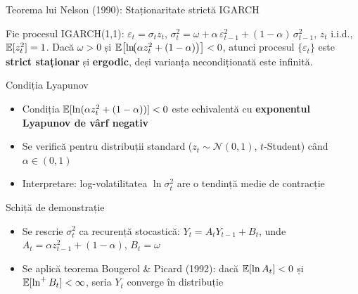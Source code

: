 \documentclass[9pt, aspectratio=169, t]{beamer}
\begin{document}
\begin{frame}{Teorema lui Nelson (1990): Staționaritate strictă IGARCH}
    \small
        \vspace{-2mm}
        \begin{thm}[Nelson, 1990]
            Fie procesul IGARCH(1,1):
            $\varepsilon_t = \sigma_t z_t$, \; $\sigma_t^2 = \omega + \alpha\,\varepsilon_{t-1}^2 + (1 - \alpha)\,\sigma_{t-1}^2$, \; $z_t$ i.i.d., $\mathbb{E}[z_t^2] = 1$.
            Dacă $\omega > 0$ și $\mathbb{E}\bigl[\ln\!\bigl(\alpha z_t^2 + (1 - \alpha)\bigr)\bigr] < 0$, atunci procesul $\{\varepsilon_t\}$ este \textbf{strict staționar} și \textbf{ergodic}, deși varianța necondiționată este infinită.
        \end{thm}
        \vspace{-1mm}
        \begin{block}{Condiția Lyapunov}
            \begin{itemize}
                \item Condiția $\mathbb{E}[\ln(\alpha z_t^2 + (1-\alpha))] < 0$ este echivalentă cu \textbf{exponentul Lyapunov de vârf negativ}
                \item Se verifică pentru distribuții standard ($z_t \sim \mathcal{N}(0,1)$, $t$-Student) când $\alpha \in (0,1)$
                \item Interpretare: log-volatilitatea $\ln \sigma_t^2$ are o tendință medie de contracție
            \end{itemize}
        \end{block}
        \vspace{-1mm}
        \begin{block}{Schiță de demonstrație}
            \begin{itemize}
                \item Se rescrie $\sigma_t^2$ ca recurență stocastică: $Y_t = A_t Y_{t-1} + B_t$, unde $A_t = \alpha z_{t-1}^2 + (1-\alpha)$, $B_t = \omega$
                \item Se aplică teorema Bougerol \& Picard (1992): dacă $\mathbb{E}[\ln A_t] < 0$ și $\mathbb{E}[\ln^+ B_t] < \infty$, seria $Y_t$ converge în distribuție
            \end{itemize}
        \end{block}
        \hfill{}
\end{frame}
\end{document}
